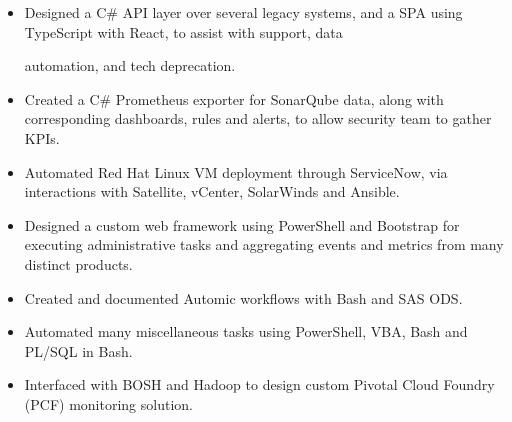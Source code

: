 \documentclass[10pt,a4paper,ragged2e,withhyper,hidelinks]{altacv}
\begin{document}
\begin{itemize}
    \item   \small{Designed a C\# API layer over several legacy systems, and a SPA using TypeScript with React, to assist with support, data \par automation, and tech deprecation.}
    \item   \small{Created a C\# Prometheus exporter for SonarQube data, along with corresponding dashboards, rules and alerts, to allow security team to gather KPIs.}
    \item   \small{Automated Red Hat Linux VM deployment through ServiceNow, via interactions with Satellite, vCenter, SolarWinds and Ansible.}
    \item   \small{Designed a custom web framework using PowerShell and Bootstrap for executing administrative tasks and aggregating events and metrics from many distinct products.}
    \item   \small{Created and documented Automic workflows with Bash and SAS ODS.}
    \item   \small{Automated many miscellaneous tasks using PowerShell, VBA, Bash and PL/SQL in Bash.}
    \item   \small{Interfaced with BOSH and Hadoop to design custom Pivotal Cloud Foundry (PCF) monitoring solution.}
\end{itemize}

\newpage






\end{document}
